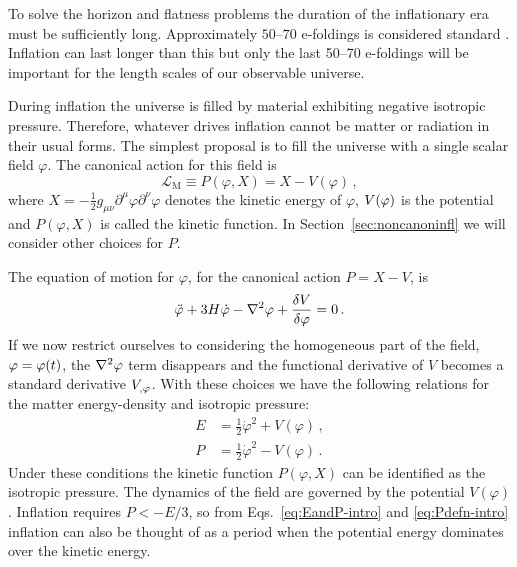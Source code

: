 To solve the horizon and flatness problems the duration of the inflationary era
must be
sufficiently long. Approximately $50$--$70$ e-foldings is considered standard
\cite{book:liddle}. Inflation
can last longer than this but only the last 50--70 e-foldings will be important
for the length scales of our observable universe. 


During inflation the universe is filled by material exhibiting negative isotropic
pressure.
Therefore, whatever drives inflation cannot be matter or radiation in their usual
forms. The simplest proposal is to fill the universe with a single scalar field
$\varphi$. The canonical action for this field is
\begin{equation}
\label{eq:phiaction-intro}
 \mathcal{L}_\mathrm{M} \equiv P(\varphi, X) = X -V(\varphi) \,,
\end{equation}
where $X=-\frac{1}{2}g_{\mu\nu}\partial^\mu\varphi \partial^\nu\varphi$ denotes
the kinetic energy of $\varphi$, $V(\varphi)$ is the potential and $P(\varphi, X)$
is called the kinetic
function. In Section~\ref{sec:noncanoninfl} we will consider other
choices for $P$. 

The equation of motion for $\varphi$, for the canonical action $P=X-V$, is
% 
\begin{equation}
 \label{eq:phieom1-intro}
 \ddot{\varphi} + 3H\dot{\varphi} -\nabla^2 \varphi + \frac{\delta V}{\delta \varphi} = 0\,.
\end{equation}
% 
If we now restrict ourselves to considering the homogeneous part of the field,
$\varphi=\varphi(t)$, the $\nabla^2\varphi$ term disappears and the functional derivative
of $V$ becomes a standard derivative $V_{,\varphi}$. 
With these choices we have the following relations for the matter
energy-density and isotropic pressure:
% 
\begin{align}
\label{eq:EandP-intro}
 E &= \frac{1}{2}\dot{\varphi}^2 + V(\varphi) \,,\\
\label{eq:Pdefn-intro}
 P &= \frac{1}{2}\dot{\varphi}^2 - V(\varphi) \,.
\end{align}
% 
Under these conditions the kinetic function $P(\varphi, X)$ can be identified as
the isotropic pressure. The dynamics of the field are governed by the potential
$V(\varphi)$. Inflation requires $P<-E/3$, so from Eqs.~\eqref{eq:EandP-intro} and
\eqref{eq:Pdefn-intro} inflation
can also be thought of as a period when the potential energy dominates over
the kinetic energy. 


